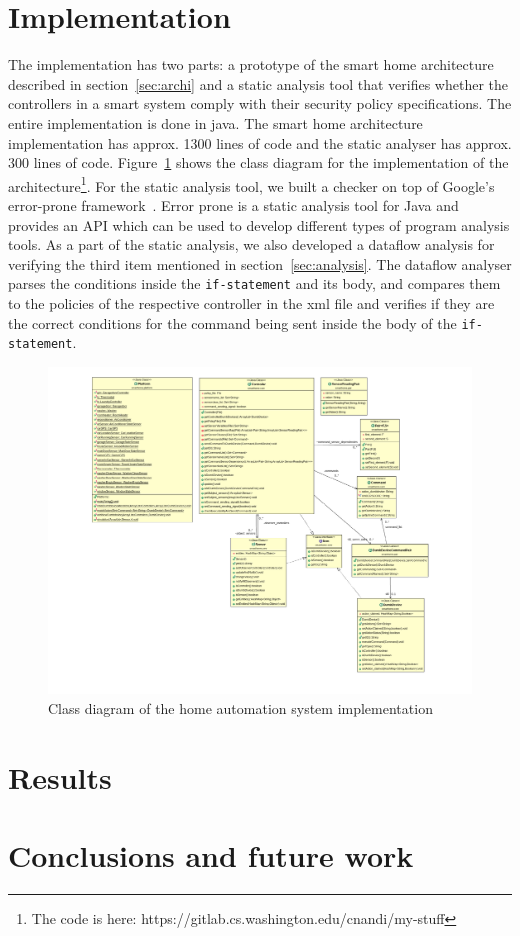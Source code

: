 \documentclass{article}
\begin{document}
\section{Implementation}
The implementation has two parts: a prototype of the smart home architecture described in section~\ref{sec:archi} and a static analysis tool that verifies whether the controllers in a smart system comply with their security policy specifications. The entire implementation is done in java. The smart home architecture implementation has approx. 1300 lines of code and the static analyser has approx. 300 lines of code. Figure~\ref{fig:classdia} shows the class diagram for the implementation of the architecture\footnote{The code is here: https://gitlab.cs.washington.edu/cnandi/my-stuff}. 
For the static analysis tool, we built a checker on top of Google's error-prone framework~\cite{errorprone}. Error prone is a static analysis tool for Java and provides an API which can be used to develop different types of program analysis tools. As a part of the static analysis, we also developed a dataflow analysis for verifying the third item mentioned in section~\ref{sec:analysis}. The dataflow analyser parses the conditions inside the \texttt{if-statement} and its body, and compares them to the policies of the respective controller in the xml file and verifies if they are the correct conditions for the command being sent inside the body of the \texttt{if-statement}. 

\begin{figure}[htpb]
\begin{center}
\includegraphics[scale=0.7, trim ={1cm 0 0 7.7cm}]{class-diagram.pdf}
\caption{Class diagram of the home automation system implementation}
\label{fig:classdia}
\end{center}
\end{figure}

\section{Results}

\section{Conclusions and future work}


\end{document}
